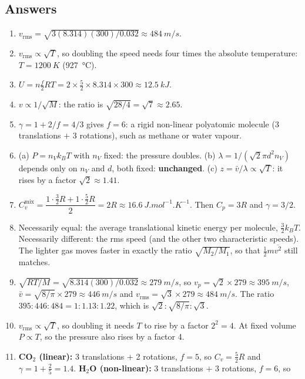 \subsection*{Answers}
{\small
\begin{enumerate}[itemsep=2pt]
\item $v_{\text{rms}} = \sqrt{3(8.314)(300)/0.032} \approx \SI{484}{m/s}$.
\item $v_{\text{rms}} \propto \sqrt{T}$, so doubling the speed needs four times the absolute temperature:
      $T = \SI{1200}{K}$ (\SI{927}{\celsius}).
\item $U = n\tfrac{f}{2}RT = 2\times\tfrac52\times8.314\times300 \approx \SI{12.5}{kJ}$.
\item $v \propto 1/\sqrt{M}$: the ratio is $\sqrt{28/4} = \sqrt7 \approx 2.65$.
\item $\gamma = 1 + 2/f = 4/3$ gives $f = 6$: a rigid non-linear polyatomic molecule (3 translations
      $+$ 3 rotations), such as methane or water vapour.
\item (a) $P = n_Vk_BT$ with $n_V$ fixed: the pressure doubles. (b) $\lambda = 1/(\sqrt2\pi d^2 n_V)$
      depends only on $n_V$ and $d$, both fixed: \textbf{unchanged}. (c) $z=\bar v/\lambda \propto
      \sqrt{T}$: it rises by a factor $\sqrt2\approx1.41$.
\item $C_v^{\text{mix}} = \dfrac{1\cdot\tfrac32R + 1\cdot\tfrac52R}{2} = 2R \approx
      \SI{16.6}{J.mol^{-1}.K^{-1}}$. Then $C_p = 3R$ and $\gamma = 3/2$.
\item Necessarily equal: the average translational kinetic energy per molecule, $\tfrac32k_BT$.
      Necessarily different: the rms speed (and the other two characteristic speeds). The lighter gas
      moves faster in exactly the ratio $\sqrt{M_2/M_1}$, so that $\tfrac12 m\overline{v^2}$ still
      matches.
\item $\sqrt{RT/M} = \sqrt{8.314(300)/0.032} \approx \SI{279}{m/s}$, so
      $v_p=\sqrt2\times279 \approx \SI{395}{m/s}$, $\bar v = \sqrt{8/\pi}\times279\approx\SI{446}{m/s}$ and
      $v_{\text{rms}} = \sqrt3\times279\approx\SI{484}{m/s}$. The ratio $395:446:484 = 1:1.13:1.22$, which
      is $\sqrt2:\sqrt{8/\pi}:\sqrt3$.
\item $v_{\text{rms}}\propto\sqrt T$, so doubling it needs $T$ to rise by a factor $2^2 = 4$. At fixed
      volume $P\propto T$, so the pressure also rises by a factor 4.
\item \textbf{CO$_2$ (linear):} 3 translations $+$ 2 rotations, $f=5$, so $C_v=\tfrac52R$ and
      $\gamma = 1+\tfrac25 = 1.4$. \textbf{H$_2$O (non-linear):} 3 translations $+$ 3 rotations, $f=6$, so

\end{enumerate}}
